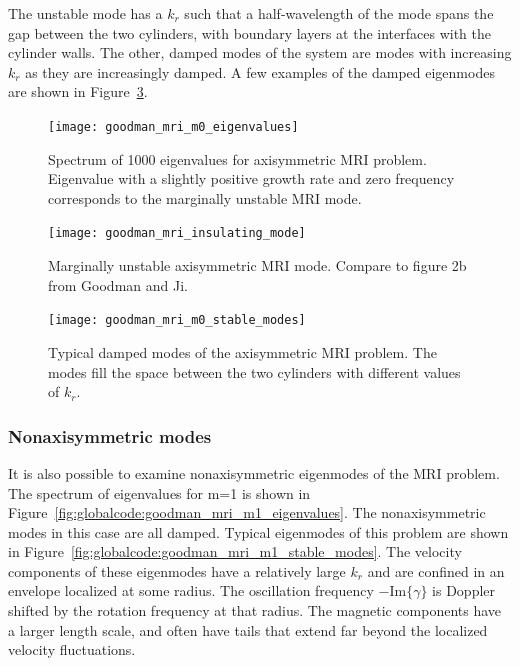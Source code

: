\documentclass[letterpaper]{article}
\begin{document}
The unstable mode has a $k_r$ such that a half-wavelength of the mode
spans the gap between the two cylinders, with boundary layers at the
interfaces with the cylinder walls. The other, damped modes of the
system are modes with increasing $k_r$ as they are increasingly
damped.  A few examples of the damped eigenmodes are shown in
Figure~\ref{fig:globalcode:goodman_mri_m0_stable_modes}.

\begin{figure}
\centering
\texttt{[image: goodman\_mri\_m0\_eigenvalues]}
\caption[Eigenvalue spectrum for the axisymmetric MRI
  problem]{Spectrum of 1000 eigenvalues for axisymmetric MRI problem.
  Eigenvalue with a slightly positive growth rate and zero frequency
  corresponds to the marginally unstable MRI mode.}
\label{fig:globalcode:goodman_mri_m0_eigenvalues}
\end{figure}


\begin{figure}
\centering
\texttt{[image: goodman\_mri\_insulating\_mode]}
\caption[Marginally unstable eigenmode of the axisymmetric MRI
  problem]{Marginally unstable axisymmetric MRI mode. Compare to
  figure 2{b} from Goodman and Ji.}
\label{fig:globalcode:goodman_mri_insulating_mode}
\end{figure}

\begin{figure}
\centering
\texttt{[image: goodman\_mri\_m0\_stable\_modes]}
\caption[Damped eigenmodes of the axisymmetric MRI problem]{Typical
  damped modes of the axisymmetric MRI problem.  The modes fill the
  space between the two cylinders with different values of $k_r$.}
\label{fig:globalcode:goodman_mri_m0_stable_modes}
\end{figure}

\subsubsection{Nonaxisymmetric modes}

It is also possible to examine nonaxisymmetric eigenmodes of the MRI
problem. The spectrum of eigenvalues for m=1 is shown in
Figure~\ref{fig:globalcode:goodman_mri_m1_eigenvalues}.  The
nonaxisymmetric modes in this case are all damped.  Typical eigenmodes
of this problem are shown in
Figure~\ref{fig:globalcode:goodman_mri_m1_stable_modes}.  The velocity
components of these eigenmodes have a relatively large $k_r$ and are
confined in an envelope localized at some radius. The oscillation
frequency $-\mathrm{Im}\{\gamma\}$ is Doppler shifted by the rotation
frequency at that radius. The magnetic components have a larger length
scale, and often have tails that extend far beyond the localized
velocity fluctuations.
\end{document}
